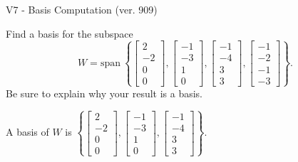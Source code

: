 \begin{exercise}
  \begin{exerciseTitle}V7 - Basis Computation (ver. 909)\end{exerciseTitle}
  \begin{exerciseStatement}
    Find a basis for the subspace 
\[W=\mathrm{span}\ \left\{\left[\begin{array}{r}
2 \\
-2 \\
0 \\
0
\end{array}\right] , \left[\begin{array}{r}
-1 \\
-3 \\
1 \\
0
\end{array}\right] , \left[\begin{array}{r}
-1 \\
-4 \\
3 \\
3
\end{array}\right] , \left[\begin{array}{r}
-1 \\
-2 \\
-1 \\
-3
\end{array}\right]\right\}.\]
 Be sure to explain why your result is a basis.


  \end{exerciseStatement}
  \begin{exerciseAnswer}
   A basis of \(W\) is  \(\left\{\left[\begin{array}{r}
2 \\
-2 \\
0 \\
0
\end{array}\right] , \left[\begin{array}{r}
-1 \\
-3 \\
1 \\
0
\end{array}\right] , \left[\begin{array}{r}
-1 \\
-4 \\
3 \\
3
\end{array}\right]\right\}\).
  


  \end{exerciseAnswer}
\end{exercise}